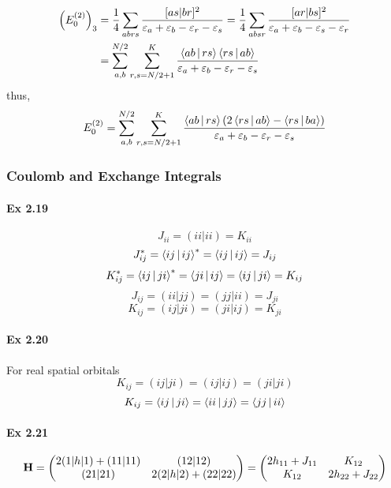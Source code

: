 \documentclass[a4paper]{article}
\newcommand{\ex}[1]{\paragraph{Ex #1}}
\numberwithin{equation}{subsection}
\begin{document}
\begin{equation}\label{key}
\begin{aligned}
\qty(E_0^{(2)})_3 &= \dfrac{1}{4}\sum_{abrs} \dfrac{[as|br]^2}{\varepsilon_a+\varepsilon_b-\varepsilon_r-\varepsilon_s} = \dfrac{1}{4}\sum_{absr}\dfrac{[ar|bs]^2}{\varepsilon_a+\varepsilon_b-\varepsilon_s-\varepsilon_r}\\
&= \sum_{a,b}^{N/2}\sum_{r,s=N/2+1}^K \dfrac{\Braket{ab|rs}\Braket{rs|ab}}{\varepsilon_a+\varepsilon_b-\varepsilon_r-\varepsilon_s}
\end{aligned}
\end{equation}
thus,
\begin{equation}\label{key}
E_0^{(2)} = \sum_{a,b}^{N/2}\sum_{r,s=N/2+1}^K \dfrac{\Braket{ab|rs}(2\Braket{rs|ab} - \Braket{rs|ba})}{\varepsilon_a+\varepsilon_b-\varepsilon_r-\varepsilon_s}
\end{equation}

\subsubsection{Coulomb and Exchange Integrals}
\ex{2.19}
\begin{equation}\label{key}
J_{ii} = (ii|ii) = K_{ii} 
\end{equation}
\begin{equation}\label{key}
J_{ij}^* = \Braket{ij|ij}^* = \Braket{ij|ij} = J_{ij}
\end{equation}
\begin{equation}\label{key}
K_{ij}^* = \Braket{ij|ji}^* = \Braket{ji|ij} = \Braket{ij|ji} = K_{ij}
\end{equation}
\begin{equation}\label{key}
J_{ij} = (ii|jj) = (jj|ii) = J_{ji}
\end{equation}
\begin{equation}\label{key}
K_{ij} = (ij|ji) = (ji|ij) = K_{ji}
\end{equation}

\ex{2.20}
For real spatial orbitals
\begin{equation}\label{key}
K_{ij} = (ij|ji) = (ij|ij) = (ji|ji)
\end{equation}
\begin{equation}\label{key}
K_{ij} = \Braket{ij|ji} = \Braket{ii|jj} = \Braket{jj|ii}
\end{equation}

\ex{2.21}
\begin{equation}\label{key}
\vb{H} = \mqty(2(1|h|1) + (11|11) & (12|12)\\
(21|21) & 2(2|h|2) + (22|22)) = 
\mqty(2h_{11} + J_{11} & K_{12}\\
      K_{12} & 2h_{22} + J_{22})
\end{equation}
\end{document}
